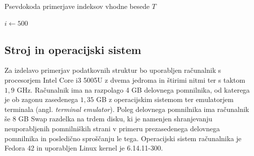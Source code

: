 \begin{algorithm}[htb]

\caption{Psevdokoda primerjave indeksov vhodne besede $T$}\label{alg:metodaTest}
{
    {$i \leftarrow 500$}
    
    
}
\end{algorithm}

\subsection{Stroj in operacijski sistem}
Za izdelavo primerjav podatkovnih struktur bo uporabljen računalnik s procesorjem Intel Core i3 5005U z dvema jedroma in štirimi nitmi ter s taktom $1,9$ GHz. Računalnik ima na razpolago 4 GB delovnega pomnilnika, od katerega je ob zagonu zasedenega $1,35$ GB z operacijskim sistemom ter emulatorjem terminala (angl. \textit{terminal emulator}). Poleg delovnega pomnilnika ima računalnik še $8$ GB Swap razdelka na trdem disku, ki je namenjen shranjevanju neuporabljenih pomnilniških strani v primeru prezasedenega delovnega pomnilnika in posledično sproščanju le tega. Operacijski sistem računalnika je Fedora 42 in uporabljen Linux kernel je 6.14.11-300.

